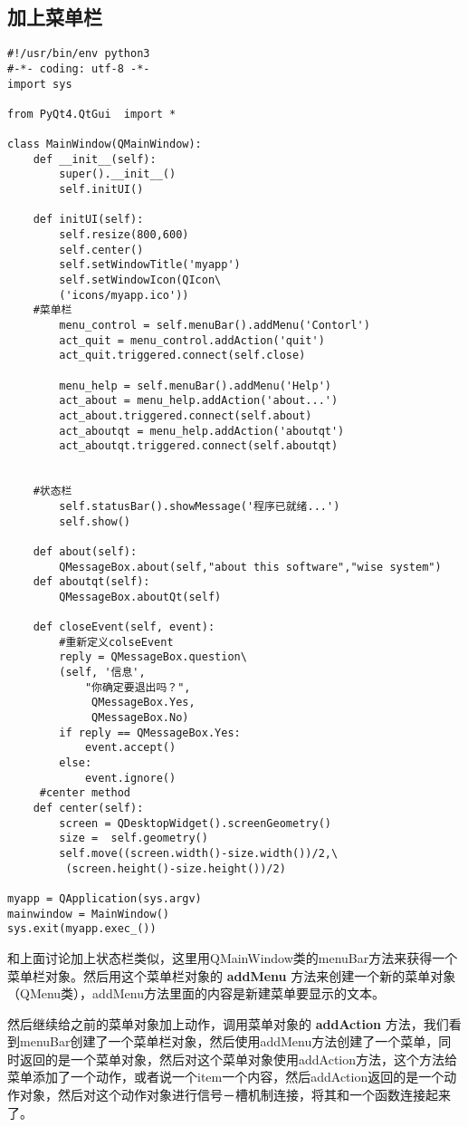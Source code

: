 \documentclass[11pt,oneside]{article}
\begin{document}
\subsection{加上菜单栏}
\label{sec:orgheadline12}
\begin{verbatim}
#!/usr/bin/env python3
#-*- coding: utf-8 -*-
import sys

from PyQt4.QtGui  import *

class MainWindow(QMainWindow):
    def __init__(self):
        super().__init__()
        self.initUI()

    def initUI(self):
        self.resize(800,600)
        self.center()
        self.setWindowTitle('myapp')
        self.setWindowIcon(QIcon\
        ('icons/myapp.ico'))
    #菜单栏
        menu_control = self.menuBar().addMenu('Contorl')
        act_quit = menu_control.addAction('quit')
        act_quit.triggered.connect(self.close)

        menu_help = self.menuBar().addMenu('Help')
        act_about = menu_help.addAction('about...')
        act_about.triggered.connect(self.about)
        act_aboutqt = menu_help.addAction('aboutqt')
        act_aboutqt.triggered.connect(self.aboutqt)


    #状态栏
        self.statusBar().showMessage('程序已就绪...')
        self.show()

    def about(self):
        QMessageBox.about(self,"about this software","wise system")
    def aboutqt(self):
        QMessageBox.aboutQt(self)

    def closeEvent(self, event):
        #重新定义colseEvent
        reply = QMessageBox.question\
        (self, '信息',
            "你确定要退出吗？",
             QMessageBox.Yes,
             QMessageBox.No)
        if reply == QMessageBox.Yes:
            event.accept()
        else:
            event.ignore()
     #center method
    def center(self):
        screen = QDesktopWidget().screenGeometry()
        size =  self.geometry()
        self.move((screen.width()-size.width())/2,\
         (screen.height()-size.height())/2)

myapp = QApplication(sys.argv)
mainwindow = MainWindow()
sys.exit(myapp.exec_())
\end{verbatim}

和上面讨论加上状态栏类似，这里用QMainWindow类的menuBar方法来获得一个菜单栏对象。然后用这个菜单栏对象的 \textbf{addMenu} 方法来创建一个新的菜单对象（QMenu类），addMenu方法里面的内容是新建菜单要显示的文本。

然后继续给之前的菜单对象加上动作，调用菜单对象的 \textbf{addAction} 方法，我们看到menuBar创建了一个菜单栏对象，然后使用addMenu方法创建了一个菜单，同时返回的是一个菜单对象，然后对这个菜单对象使用addAction方法，这个方法给菜单添加了一个动作，或者说一个item一个内容，然后addAction返回的是一个动作对象，然后对这个动作对象进行信号－槽机制连接，将其和一个函数连接起来了。
\end{document}
